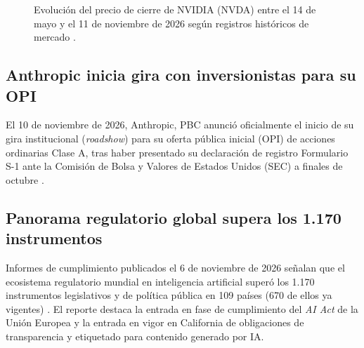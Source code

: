 \documentclass[conference,twocolumn,spanish]{IEEEtran}
\begin{document}
\begin{figure}[htbp]
\centering
{}
\caption{Evolución del precio de cierre de NVIDIA (NVDA) entre el 14 de mayo y el 11 de noviembre de 2026 según registros históricos de mercado \cite{nvda_history_2026}.}
\label{fig:nvda_6m}
\end{figure}

\subsection{Anthropic inicia gira con inversionistas para su OPI}
El 10 de noviembre de 2026, Anthropic, PBC anunció oficialmente el inicio de su gira institucional (\textit{roadshow}) para su oferta pública inicial (OPI) de acciones ordinarias Clase A, tras haber presentado su declaración de registro Formulario S-1 ante la Comisión de Bolsa y Valores de Estados Unidos (SEC) a finales de octubre \cite{anthropic_ipo_2026}.

\subsection{Panorama regulatorio global supera los 1.170 instrumentos}
Informes de cumplimiento publicados el 6 de noviembre de 2026 señalan que el ecosistema regulatorio mundial en inteligencia artificial superó los 1.170 instrumentos legislativos y de política pública en 109 países (670 de ellos ya vigentes) \cite{ai_regulation_2026}. El reporte destaca la entrada en fase de cumplimiento del \textit{AI Act} de la Unión Europea y la entrada en vigor en California de obligaciones de transparencia y etiquetado para contenido generado por IA.



\end{document}
